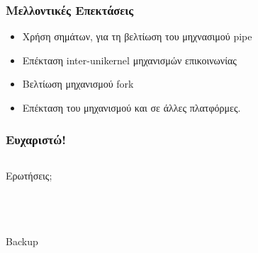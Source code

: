 \documentclass[red,slidestop,notes,compress,mathserif]{beamer}
\begin{document}
\begin{frame}
\frametitle{Μελλοντικές Επεκτάσεις}
\begin{itemize}
\item Χρήση σημάτων, για τη βελτίωση του μηχνασιμού pipe
\item Επέκταση inter-unikernel μηχανισμών επικοινωνίας 
\item Βελτίωση μηχανισμού fork
\item Επέκταση του μηχανισμού και σε άλλες πλατφόρμες.
\end{itemize}

\end{frame}
%
\begin{frame}
\frametitle{Ευχαριστώ!}
                \vfill%
\begin{columns}
        \begin{center}
        \begin{center}
                        {\LARGE Ερωτήσεις;}
        \end{center}
                \vfill%
        \end{center}
\end{columns}
                \vfill%
\end{frame}


\begin{frame}
\frametitle{}
                \vfill%
\begin{columns}
        \begin{center}
                \vfill%
        \end{center}
\end{columns}
                \vfill%
\end{frame}
%
\begin{frame}
\frametitle{}
                \vfill%
\begin{columns}
        \begin{center}
        \begin{center}
                        {\LARGE Backup}
        \end{center}
                \vfill%
        \end{center}
\end{columns}
                \vfill%
\end{frame}
\end{document}
